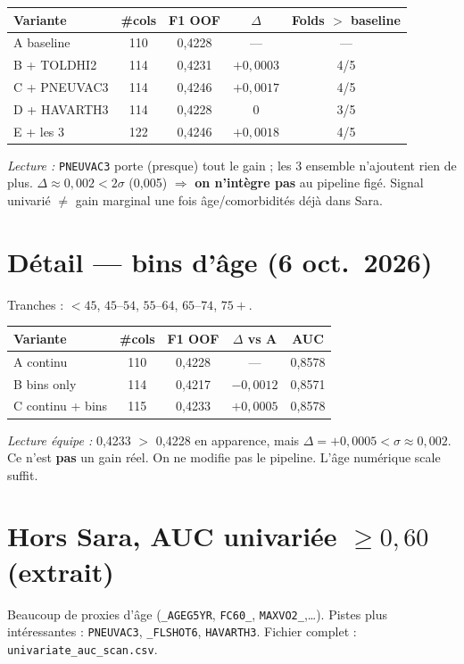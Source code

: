 \documentclass[11pt,a4paper]{article}
\begin{document}
\begin{center}
\begin{tabular}{@{}lcccc@{}}
\toprule
Variante & \#cols & F1 OOF & $\Delta$ & Folds $>$ baseline \\
\midrule
A baseline & 110 & 0{,}4228 & --- & --- \\
B + TOLDHI2 & 114 & 0{,}4231 & $+0{,}0003$ & 4/5 \\
C + PNEUVAC3 & 114 & 0{,}4246 & $+0{,}0017$ & 4/5 \\
D + HAVARTH3 & 114 & 0{,}4228 & $0$ & 3/5 \\
E + les 3 & 122 & 0{,}4246 & $+0{,}0018$ & 4/5 \\
\bottomrule
\end{tabular}
\end{center}

\noindent\textit{Lecture :} \texttt{PNEUVAC3} porte (presque) tout le gain ; les 3 ensemble
n'ajoutent rien de plus. $\Delta\approx0{,}002 < 2\sigma$ (0{,}005) $\Rightarrow$
\textbf{on n'intègre pas} au pipeline figé. Signal univarié $\neq$ gain marginal
une fois âge/comorbidités déjà dans Sara.

\section{Détail --- bins d'âge (6 oct.\ 2026)}
Tranches : $<45$, $45$--$54$, $55$--$64$, $65$--$74$, $75+$.

\begin{center}
\begin{tabular}{@{}lcccc@{}}
\toprule
Variante & \#cols & F1 OOF & $\Delta$ vs A & AUC \\
\midrule
A continu & 110 & 0{,}4228 & --- & 0{,}8578 \\
B bins only & 114 & 0{,}4217 & $-0{,}0012$ & 0{,}8571 \\
C continu + bins & 115 & 0{,}4233 & $+0{,}0005$ & 0{,}8578 \\
\bottomrule
\end{tabular}
\end{center}

\noindent\textit{Lecture équipe :} 0{,}4233 $>$ 0{,}4228 en apparence, mais
$\Delta=+0{,}0005 < \sigma\approx0{,}002$. Ce n'est \textbf{pas} un gain réel.
On ne modifie pas le pipeline. L'âge numérique scale suffit.

\section{Hors Sara, AUC univariée $\ge 0{,}60$ (extrait)}
Beaucoup de proxies d'âge (\texttt{\_AGEG5YR}, \texttt{FC60\_}, \texttt{MAXVO2\_},\ldots).
Pistes plus intéressantes : \texttt{PNEUVAC3}, \texttt{\_FLSHOT6}, \texttt{HAVARTH3}.
Fichier complet : \texttt{univariate\_auc\_scan.csv}.
\end{document}
